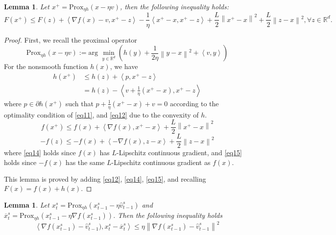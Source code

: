 \documentclass{article}
\newcommand*{\R}{\mathbb{R}}
\newcommand*{\Po}{\text{Prox}}
\newcommand{\norm}[1]{\left\lVert#1\right\rVert}
\newcommand{\Iprod}[2]{\left\langle #1,#2\right\rangle}
\newtheorem{lemma}[theorem]{Lemma}
\theoremstyle{definition}
\theoremstyle{remark}
\begin{document}
\begin{lemma}\label{lemma1}
Let $x^+ = \Po_{\eta h}(x-\eta v)$, then the following inequality holds:
\begin{equation}\label{eq10}
F(x^+) \leq F(z) + \Iprod{\nabla f(x)-v}{x^+-z}-\frac{1}{\eta} \Iprod{x^+-x}{x^+-z}+\frac{L}{2}\norm{x^+-x}^2+\frac{L}{2}\norm{z-x}^2, \forall z\in \R^d. 
\end{equation}
\end{lemma}
\begin{proof}
First, we recall the proximal operator 
\begin{equation}\label{eq11}
\Po_{\eta h}(x-\eta v) := \text{arg}\,\,\min_{y\in\R^d}\left(h(y)+\frac{1}{2\eta}\norm{y-x}^2+\Iprod{v}{y}\right)
\end{equation}
For the nonsmooth function $h(x)$, we have 
\begin{equation}\label{eq12}
\begin{split}
h(x^+) &\leq h(z) + \Iprod{p}{x^+-z}\\
&= h(z) - \Iprod{v+\frac{1}{\eta}(x^+-x)}{x^+-z}
\end{split}
\end{equation}
where $p\in \partial h(x^+)$ such that $p+\frac{1}{\eta}(x^+-x)+v = 0$ according to the optimality condition of \eqref{eq11}, and \eqref{eq12} due to the convexity of $h$.
\begin{equation}\label{eq14}
f(x^+) \leq f(x)+\Iprod{\nabla f(x)}{x^+-x}+\frac{L}{2}\norm{x^+-x}^2
\end{equation}
\begin{equation}\label{eq15}
-f(z) \leq -f(x)+\Iprod{-\nabla f(x)}{z-x}+\frac{L}{2}\norm{z-x}^2
\end{equation}
where \eqref{eq14} holds since $f(x)$ has $L$-Lipschitz continuous gradient, and \eqref{eq15} holds since $-f(x)$ has the same $L$-Lipschitz continuous gradient as $f(x)$. 

 This lemma is proved by adding \eqref{eq12}, \eqref{eq14}, \eqref{eq15}, and recalling $F(x) = f(x)+h(x)$. 
\end{proof}
\begin{lemma}\label{lemm-est-grad}
Let  $x_{t}^s= \Po_{\eta h}(x_{t-1}^s - \eta \hat{v}_{t-1}^s)$ and $\overline{x}_{t}^s= \Po_{\eta h}(x_{t-1}^s - \eta \nabla f(x_{t-1}^s))$. Then the following inequality holds
\[
\Iprod{\nabla f(x_{t-1}^s) -\hat{v}_{t-1}^s)}{x_t^s -\overline{x}_t^s} \leq \eta\norm{\nabla f(x_{t-1}^s)-\hat{v}_{t-1}^s}^2
\]
\end{lemma}
\end{document}
